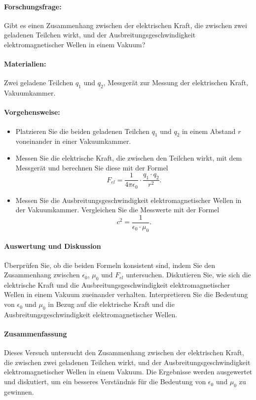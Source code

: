 \documentclass[a4paper]{report}
\begin{document}
\paragraph{Forschungsfrage:}
Gibt es einen Zusammenhang zwischen der elektrischen Kraft, die zwischen zwei geladenen Teilchen wirkt, und der Ausbreitungsgeschwindigkeit elektromagnetischer Wellen in einem Vakuum?

\paragraph{Materialien:}

    Zwei geladene Teilchen $q_1$ und $q_2$,
    Messgerät zur Messung der elektrischen Kraft,
    Vakuumkammer.

\paragraph{Vorgehensweise:}
\begin{itemize}
  \item Platzieren Sie die beiden geladenen Teilchen $q_1$ und $q_2$ in einem Abstand $r$ voneinander in einer Vakuumkammer.
  \item Messen Sie die elektrische Kraft, die zwischen den Teilchen wirkt, mit dem Messgerät und berechnen Sie diese mit der Formel
    $$F_{el} = \dfrac{1}{4  \pi \epsilon_0} \cdot \dfrac{q_1 \cdot q_2}{r^2}.$$
  \item Messen Sie die Ausbreitungsgeschwindigkeit elektromagnetischer Wellen in der Vakuumkammer.
    Vergleichen Sie die Messwerte mit der Formel
    $$c^2 = \dfrac{1}{\epsilon_0 \cdot \mu_0}.$$
\end{itemize}
    \paragraph{Auswertung und Diskussion}

    Überprüfen Sie, ob die beiden Formeln konsistent sind, indem Sie den Zusammenhang zwischen $\epsilon_0$, $\mu_0$ und $F_{el}$ untersuchen.
    Diskutieren Sie, wie sich die elektrische Kraft und die Ausbreitungsgeschwindigkeit elektromagnetischer Wellen in einem Vakuum zueinander verhalten.
    Interpretieren Sie die Bedeutung von $\epsilon_0$ und $\mu_0$ in Bezug auf die elektrische Kraft und die Ausbreitungsgeschwindigkeit elektromagnetischer Wellen.

\paragraph{Zusammenfassung}
Dieses Versuch untersucht den Zusammenhang zwischen der elektrischen Kraft, die
zwischen zwei geladenen Teilchen wirkt, und der Ausbreitungsgeschwindigkeit
elektromagnetischer Wellen in einem Vakuum. Die Ergebnisse werden ausgewertet
und diskutiert, um ein besseres Verständnis für die Bedeutung von $\epsilon_0$
und $\mu_0$ zu gewinnen.
\end{document}
